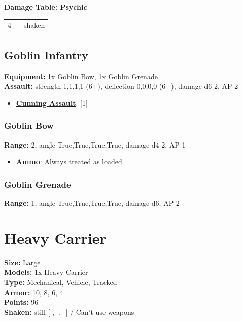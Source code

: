 \documentclass[a4paper,12pt]{article}
\begin{document}
\noindent\textbf{Damage Table: Psychic}

\begin{tabular}{ll}
4+ & shaken \\
\end{tabular}
\vspace{1ex}

\subsection{Goblin Infantry}

\textbf{Equipment:} 1x Goblin Bow, 1x Goblin Grenade \\

\textbf{Assault:} strength 1,1,1,1 (6+),
deflection 0,0,0,0 (6+),
damage d6-2, AP 2

\begin{itemize}
\item \textbf{\hyperref[rule-special-cunning-assault]{Cunning Assault}}: [1]
\end{itemize}

\subsubsection{Goblin Bow}

\textbf{Range:} 2, angle True,True,True,True, damage d4-2, AP 1

\begin{itemize}
\item \textbf{\hyperref[rule-special-ammo]{Ammo}}: Always treated as loaded
\end{itemize}
\subsubsection{Goblin Grenade}

\textbf{Range:} 1, angle True,True,True,True, damage d6, AP 2


\newpage
\section{Heavy Carrier}

\textbf{Size:} Large \\
\textbf{Models:} 1x Heavy Carrier \\
\textbf{Type:} Mechanical, Vehicle, Tracked \\
\textbf{Armor:} 10, 8, 6, 4 \\
\textbf{Points:} 96 \\
\textbf{Shaken:} still [-, -, -] / Can't use weapons
\end{document}
